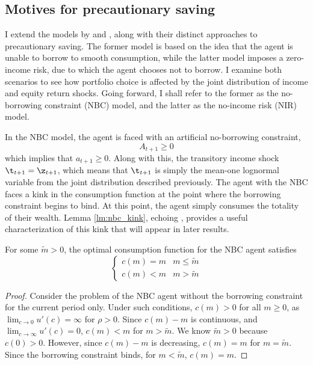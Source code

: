 \subsection{Motives for precautionary saving}

I extend the models by \citet{Deaton1991} and \citet{Carroll1992}, along with their distinct approaches to precautionary saving. The former model is based on the idea that the agent is unable to borrow to smooth consumption, while the latter model imposes a zero-income risk, due to which the agent chooses not to borrow. I examine both scenarios to see how portfolio choice is affected by the joint distribution of income and equity return shocks. Going forward, I shall refer to the former as the no-borrowing constraint (NBC) model, and the latter as the no-income risk (NIR) model.

In the NBC model, the agent is faced with an artificial no-borrowing constraint,
\[
A_{t+1} \geq 0
\]
which implies that $a_{t+1} \geq 0$. Along with this, the transitory income shock $\t_{t+1} = \z_{t+1}$, which means that $\t_{t+1}$ is simply the mean-one lognormal variable from the joint distribution described previously. The agent with the NBC faces a kink in the consumption function at the point where the borrowing constraint begins to bind. At this point, the agent simply consumes the totality of their wealth. Lemma \ref{lm:nbc_kink}, echoing \citet{Deaton1991}, provides a useful characterization of this kink that will appear in later results.

\begin{lemma}\label{lm:nbc_kink}
    For some $\tilde{m} > 0$, the optimal consumption function for the NBC agent satisfies
    \[
    \begin{cases}
        c(m) = m & m \leq \tilde{m}\\
        c(m) < m & m > \tilde{m}
    \end{cases}
    \]
\end{lemma}

\begin{proof}
    Consider the problem of the NBC agent without the borrowing constraint for the current period only. Under such conditions, $c(m) > 0$ for all $m \geq 0$, as $\lim_{c \to 0}u'(c) = \infty$ for $\rho > 0$. Since $c(m) - m$ is continuous, and $\lim_{c \to \infty}u'(c) = 0$, $c(m) < m$ for $m > \tilde{m}$. We know $\tilde{m} > 0$ because $c(0) > 0$. However, since $c(m) - m$ is decreasing, $c(m) = m$ for $m = \tilde{m}$. Since the borrowing constraint binds, for $m < \tilde{m}$, $c(m) = m$.
\end{proof}

